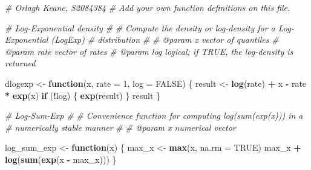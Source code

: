 \documentclass[
]{article}
\newenvironment{Shaded}{\begin{snugshade}}{\end{snugshade}}
\newcommand{\AttributeTok}[1]{\textcolor[rgb]{0.13,0.29,0.53}{#1}}
\newcommand{\CommentTok}[1]{\textcolor[rgb]{0.56,0.35,0.01}{\textit{#1}}}
\newcommand{\ConstantTok}[1]{\textcolor[rgb]{0.56,0.35,0.01}{#1}}
\newcommand{\ControlFlowTok}[1]{\textcolor[rgb]{0.13,0.29,0.53}{\textbf{#1}}}
\newcommand{\DecValTok}[1]{\textcolor[rgb]{0.00,0.00,0.81}{#1}}
\newcommand{\FunctionTok}[1]{\textcolor[rgb]{0.13,0.29,0.53}{\textbf{#1}}}
\newcommand{\NormalTok}[1]{#1}
\newcommand{\OtherTok}[1]{\textcolor[rgb]{0.56,0.35,0.01}{#1}}
\newcommand{\SpecialCharTok}[1]{\textcolor[rgb]{0.81,0.36,0.00}{\textbf{#1}}}
\begin{document}
\begin{Shaded}
\begin{Highlighting}[]
\CommentTok{\#\textquotesingle{} Orlagh Keane, S2084384}
\CommentTok{\#\textquotesingle{} Add your own function definitions on this file.}

\CommentTok{\#\textquotesingle{} Log{-}Exponential density}
\CommentTok{\#\textquotesingle{}}
\CommentTok{\#\textquotesingle{} Compute the density or log{-}density for a Log{-}Exponential (LogExp)}
\CommentTok{\#\textquotesingle{} distribution}
\CommentTok{\#\textquotesingle{}}
\CommentTok{\#\textquotesingle{} @param x vector of quantiles}
\CommentTok{\#\textquotesingle{} @param rate vector of rates}
\CommentTok{\#\textquotesingle{} @param log logical; if TRUE, the log{-}density is returned}

\NormalTok{dlogexp }\OtherTok{\textless{}{-}} \ControlFlowTok{function}\NormalTok{(x, }\AttributeTok{rate =} \DecValTok{1}\NormalTok{, }\AttributeTok{log =} \ConstantTok{FALSE}\NormalTok{) \{}
\NormalTok{  result }\OtherTok{\textless{}{-}} \FunctionTok{log}\NormalTok{(rate) }\SpecialCharTok{+}\NormalTok{ x }\SpecialCharTok{{-}}\NormalTok{ rate }\SpecialCharTok{*} \FunctionTok{exp}\NormalTok{(x)}
  \ControlFlowTok{if}\NormalTok{ (}\SpecialCharTok{!}\NormalTok{log) \{}
    \FunctionTok{exp}\NormalTok{(result)}
\NormalTok{  \}}
\NormalTok{  result}
\NormalTok{\}}

\CommentTok{\#\textquotesingle{} Log{-}Sum{-}Exp}
\CommentTok{\#\textquotesingle{}}
\CommentTok{\#\textquotesingle{} Convenience function for computing log(sum(exp(x))) in a}
\CommentTok{\#\textquotesingle{} numerically stable manner}
\CommentTok{\#\textquotesingle{}}
\CommentTok{\#\textquotesingle{} @param x numerical vector}

\NormalTok{log\_sum\_exp }\OtherTok{\textless{}{-}} \ControlFlowTok{function}\NormalTok{(x) \{}
\NormalTok{  max\_x }\OtherTok{\textless{}{-}} \FunctionTok{max}\NormalTok{(x, }\AttributeTok{na.rm =} \ConstantTok{TRUE}\NormalTok{)}
\NormalTok{  max\_x }\SpecialCharTok{+} \FunctionTok{log}\NormalTok{(}\FunctionTok{sum}\NormalTok{(}\FunctionTok{exp}\NormalTok{(x }\SpecialCharTok{{-}}\NormalTok{ max\_x)))}
\NormalTok{\}}



\end{Highlighting}
\end{Shaded}
\end{document}
